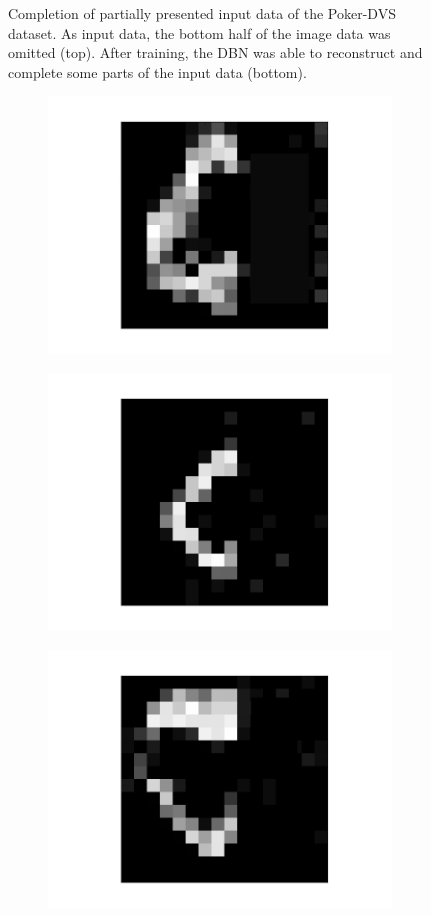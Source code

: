 \begin{figure}[h!]
\begin{subfigure}{.25\textwidth}
  		\label{fig:sub1}
	\end{subfigure}%
	\caption[Completion of partially presented input data of the Poker-DVS dataset.]{Completion of partially presented input data of the Poker-DVS dataset. As input data, the bottom half of the image data was omitted (top). After training, the DBN was able to reconstruct and complete some parts of the input data (bottom).}
	\label{fig:pokercompl}
\end{figure}


\begin{figure}[h!]
	\centering
	\begin{subfigure}{.25\textwidth}
  		\centering
  		\includegraphics[width=.6\linewidth]{imgs/poker/compl13.png}
  		\label{fig:sub1}
	\end{subfigure}%
	\begin{subfigure}{.25\textwidth}
  		\centering
  		\includegraphics[width=.6\linewidth]{imgs/poker/compl23.png}
  		\label{fig:sub1}
	\end{subfigure}%
	\begin{subfigure}{.25\textwidth}
  		\centering
  		\includegraphics[width=.6\linewidth]{imgs/poker/compl33.png}

\end{subfigure}
\end{figure}
